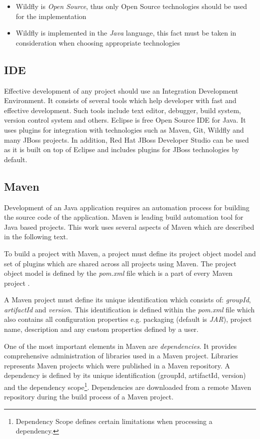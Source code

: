 \documentclass[12pt,oneside]{fithesis2}
\begin{document}
\begin{itemize}
	\item Wildfly is \textit{Open Source}, thus only Open Source technologies should be used for the implementation
	\item Wildfly is implemented in the \textit{Java} language, this fact must be taken in consideration when choosing appropriate technologies
\end{itemize}

\subsection{IDE}
Effective development of any project should use an Integration Development Environment. It consists of several tools which help developer with fast and effective development. Such tools include text editor, debugger, build system, version control system and others. Eclipse is free Open Source IDE for Java. It uses plugins for integration with technologies such as Maven, Git, Wildfly and many JBoss projects. In addition, Red Hat JBoss Developer Studio can be used as it is built on top of Eclipse and includes plugins for JBoss technologies by default.

\subsection{Maven}
Development of an Java application requires an automation process for building the source code of the application. Maven is leading build automation tool for Java based projects. This work uses several aspects of Maven which are described in the following text.

To build a project with Maven, a project must define its project object model and set of plugins which are shared across all projects using Maven. The project object model is defined by the \textit{pom.xml} file which is a part of every Maven project \cite{maven_doc}. 

A Maven project must define its unique identification which consists of: \textit{groupId}, \textit{artifactId} and \textit{version}. This identification is defined within the \textit{pom.xml} file which also contains all configuration properties e.g. packaging (default is \textit{JAR}), project name, description and any custom properties defined by a user.

One of the most important elements in Maven are \textit{dependencies}. It provides comprehensive administration of libraries used in a Maven project. Libraries represents Maven projects which were published in a Maven repository. A dependency is defined by its unique identification (groupId, artifactId, version) and the dependency scope\footnote{Dependency Scope defines certain limitations when processing a dependency.}. Dependencies are downloaded from a remote Maven repository during the build process of a Maven project.
\end{document}
